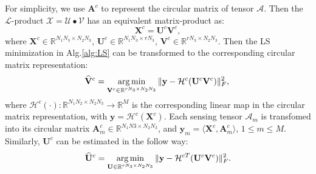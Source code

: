 \documentclass[futureinternet,article,submit,moreauthors,pdftex,10pt,a4paper]{Definitions/mdpi}
\theoremstyle{plain}
\theoremstyle{definition}
\theoremstyle{remark}
\begin{document}
For simplicity, we use $\mathbf{A}^c$ to represent the circular matrix of tensor $\mathcal{A}$. Then the $\mathcal{L}$-product $\mathcal{X} = \mathcal{U} \bullet \mathcal{V}$ has an equivalent matrix-product as:
\begin{equation}
    \mathbf{X}^c = \mathbf{U}^c\mathbf{V}^c,
\end{equation}
where $\mathbf{X}^c \in \mathbb{R}^{N_1N_3\times N_2N_3}$, $\mathbf{U}^c \in \mathbb{R}^{N_1N_3\times rN_3}$, $\mathbf{V}^c \in \mathbb{R}^{rN_3\times N_2N_3}$. Then the LS minimization in Alg.\ref{alg:LS} can be transformed to the corresponding circular matrix representation:
\begin{equation}
    \widehat{\mathbf{V}}^c = 
    \mathop{\arg\min}_{ \mathbf{V}^c \in \mathbb{R}^{rN_3 \times N_2N_3}} \| \mathbf{y} - \mathcal{H}^c(\mathbf{U}^c\mathbf{V}^c) \|_F^2 , \\
\end{equation}
where $\mathcal{H}^c(\cdot): \mathbb{R}^{N_1N_2 \times N_2N_3} \to \mathbb{R}^M$ is the corresponding linear map in the circular matrix representation, with $\mathbf{y} = \mathcal{H}^c(\mathbf{X}^c)$. Each sensing tensor $\mathcal{A}_m$ is transfomed into its circular matrix $\mathbf{A}^c_m \in \mathbb{R}^{N_1N3 \times N_2N_3}$, and $\mathbf{y}_m = \langle \mathbf{X}^c, \mathbf{A}^c_m \rangle$, $1 \leq m \leq M$. Similarly, $\mathbf{U}^c$ can be estimated in the follow way:
\begin{equation}
    \widehat{\mathbf{U}}^c =
    \mathop{\arg\min}_{ \mathbf{U} \in \mathbb{R}^{rN_3 \times N_2N_3}} \| \mathbf{y} - \mathcal{H}^{cT}(\mathbf{U}^c\mathbf{V}^c) \|_F^2 . \\
\end{equation}
\end{document}
